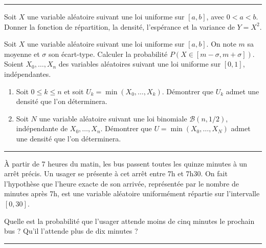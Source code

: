 \documentclass[../PolyS4.tex]{subfiles}
\begin{document}
\vspace{1em}
\hrule
\vspace{1em}


Soit $X$ une variable aléatoire suivant une loi uniforme sur $[a,b]$, avec $0<a<b$.
Donner la fonction de répartition, la densité, l'espérance et la variance de $Y=X^2$.

\newpage


Soit $X$ une variable aléatoire suivant une loi uniforme sur $[a,b]$. 
On note $m$ sa moyenne et $\sigma$ son écart-type.
 Calculer la probabilité $P(X\in [m-\sigma,m+\sigma])$.\\





Soient $X_0,\dots,X_n$ des variables aléatoires suivant une loi uniforme sur $[0,1]$, indépendantes.

\begin{enumerate}
\item Soit $0\leq k\leq n$ et soit $U_k=\min(X_0,\dots,X_k)$. Démontrer que $U_k$ admet une densité que l'on déterminera.
\item Soit $N$ une variable aléatoire suivant une loi binomiale $\mathcal B(n,1/2)$, indépendante de $X_0,\dots,X_n$. Démontrer que $U=\min(X_0,\dots,X_N)$ admet une densité que l'on déterminera.
\end{enumerate}

\vspace{1em}
\hrule
\vspace{1em}


À partir de 7 heures du matin, les bus passent toutes les quinze minutes à un arrêt précis. Un usager se présente à cet arrêt entre 7h et 7h30. On fait l'hypothèse que l'heure exacte de son arrivée, représentée par le nombre de minutes après 7h, est une variable aléatoire uniformément répartie sur l'intervalle $[0, 30]$. 

Quelle est la probabilité que l'usager attende moins de cinq minutes le prochain bus ? Qu'il l'attende plus de dix minutes ?

\vspace{1em}
\hrule
\vspace{1em}

\end{document}
